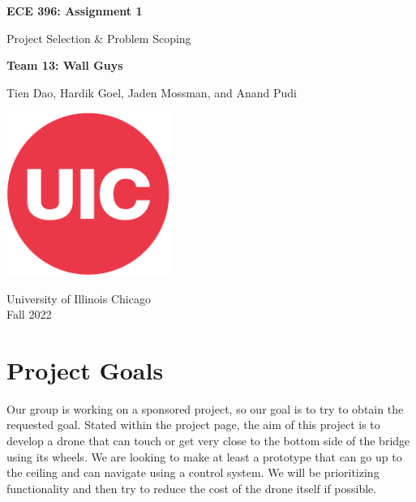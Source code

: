 \documentclass{article}
\begin{document}
    \begin{titlepage}
        \begin{center}
            \vspace*{1cm}
            \Huge\textbf{ECE 396: Assignment 1}

                \vspace{0.5cm}
                \LARGE Project Selection \& Problem Scoping
    
            \vspace{1.5cm}
            \textbf{Team 13: Wall Guys}

                \vspace{0.5cm}
                Tien Dao, Hardik Goel, Jaden Mossman, and Anand Pudi

            \vfill             
            \includegraphics[width=0.4\textwidth]{resources/uic_logo.png}

            \vspace{0.8cm}
            University of Illinois Chicago\\
            Fall 2022
                
        \end{center}
    \end{titlepage}

    \tableofcontents

    \newpage

    \section{Project Goals}
        Our group is working on a sponsored project, so our goal is to try to obtain the requested goal. Stated within the project page, the aim of this project is to develop a drone that can touch or get very close to the bottom side of the bridge using its wheels. We are looking to make at least a prototype that can go up to the ceiling and can navigate using a control system. We will be prioritizing functionality and then try to reduce the cost of the drone itself if possible.
\end{document}
